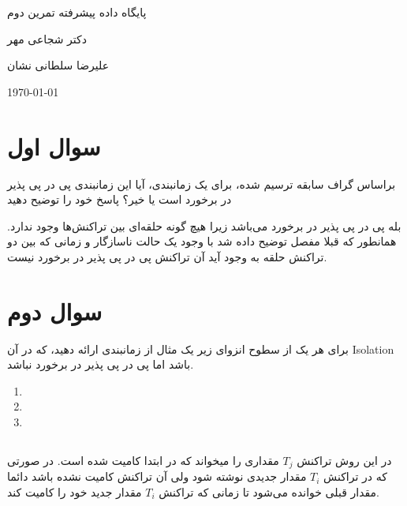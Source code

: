 \documentclass[a4paper]{article}
\begin{document}
\centerline{پایگاه داده پیشرفته تمرین دوم}
\centerline{دکتر شجاعی مهر}
\centerline{علیرضا سلطانی نشان}
\centerline{\today}

\section{سوال اول}

براساس گراف سابقه ترسیم شده، برای یک زمانبندی، آیا این زمانبندی پی در پی پذیر در
برخورد است یا خیر؟ پاسخ خود را توضیح دهید

بله پی در پی پذیر در برخورد می‌باشد زیرا هیچ گونه حلقه‌ای بین تراکنش‌ها وجود
ندارد. همانطور که قبلا مفصل توضیح داده شد با وجود یک حالت ناسازگار و زمانی که
بین دو تراکنش حلقه‌ به وجود آید آن تراکنش پی در پی پذیر در برخورد نیست.


\section{سوال دوم}

برای هر یک از سطوح انزوای زیر یک مثال از زمانبندی ارائه دهید، که در آن Isolation
باشد اما پی در پی پذیر در برخورد نباشد.

\begin{enumerate}
    \item {}
    \item {}
    \item {}
\end{enumerate}


\subsection{}

در این روش تراکنش $T_{j}$ مقداری را میخواند که در ابتدا کامیت شده است. در صورتی
که در تراکنش $T_{i}$ مقدار جدیدی نوشته شود ولی آن تراکنش کامیت نشده باشد دائما
مقدار قبلی خوانده می‌شود تا زمانی که تراکنش $T_{i}$ مقدار جدید خود را کامیت کند.

\begin{LTR}
    \begin{table}[h]
        \centering
    \end{table}
\end{LTR}
\end{document}
